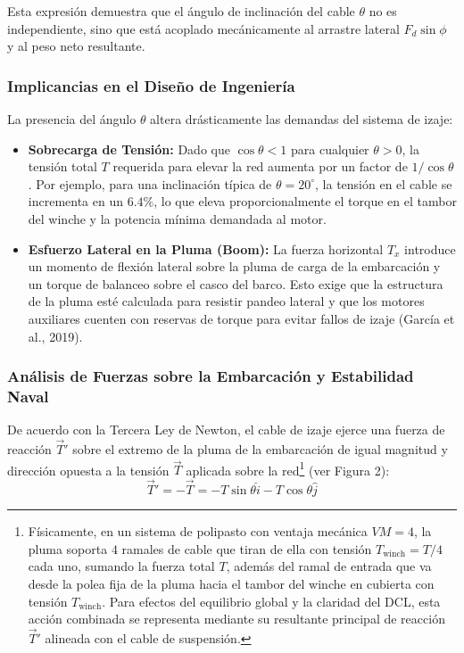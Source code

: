 \documentclass[11pt,a4paper]{article}
\begin{document}
Esta expresión demuestra que el ángulo de inclinación del cable $\theta$ no es independiente, sino que está acoplado mecánicamente al arrastre lateral $F_d \sin\phi$ y al peso neto resultante.

\subsubsection{Implicancias en el Diseño de Ingeniería}
La presencia del ángulo $\theta$ altera drásticamente las demandas del sistema de izaje:
\begin{itemize}
    \item \textbf{Sobrecarga de Tensión:} Dado que $\cos\theta < 1$ para cualquier $\theta > 0$, la tensión total $T$ requerida para elevar la red aumenta por un factor de $1/\cos\theta$. Por ejemplo, para una inclinación típica de $\theta = 20^\circ$, la tensión en el cable se incrementa en un $6.4\%$, lo que eleva proporcionalmente el torque en el tambor del winche y la potencia mínima demandada al motor.
    \item \textbf{Esfuerzo Lateral en la Pluma (Boom):} La fuerza horizontal $T_x$ introduce un momento de flexión lateral sobre la pluma de carga de la embarcación y un torque de balanceo sobre el casco del barco. Esto exige que la estructura de la pluma esté calculada para resistir pandeo lateral y que los motores auxiliares cuenten con reservas de torque para evitar fallos de izaje (García et al., 2019).
\end{itemize}

\subsubsection{Análisis de Fuerzas sobre la Embarcación y Estabilidad Naval}
De acuerdo con la Tercera Ley de Newton, el cable de izaje ejerce una fuerza de reacción $\vec{T}'$ sobre el extremo de la pluma de la embarcación de igual magnitud y dirección opuesta a la tensión $\vec{T}$ aplicada sobre la red\footnote{Físicamente, en un sistema de polipasto con ventaja mecánica $VM = 4$, la pluma soporta $4$ ramales de cable que tiran de ella con tensión $T_{\text{winch}} = T/4$ cada uno, sumando la fuerza total $T$, además del ramal de entrada que va desde la polea fija de la pluma hacia el tambor del winche en cubierta con tensión $T_{\text{winch}}$. Para efectos del equilibrio global y la claridad del DCL, esta acción combinada se representa mediante su resultante principal de reacción $\vec{T}'$ alineada con el cable de suspensión.} (ver Figura 2):
\begin{equation}\label{eq:reaccion_tension}
\vec{T}' = -\vec{T} = -T\sin\theta \hat{i} - T\cos\theta \hat{j}
\end{equation}
\end{document}
